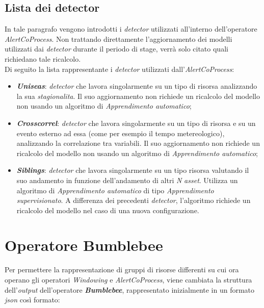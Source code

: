 \subsection{Lista dei detector}\label{sec:detector-alertcoprocess}
In tale paragrafo vengono introdotti i \textit{detector} utilizzati all'interno dell'operatore \textit{AlertCoProcess}. Non trattando direttamente l'aggiornamento dei modelli utilizzati dai \textit{detector} durante il periodo di stage, verrà solo citato quali richiedano tale ricalcolo.\\
Di seguito la lista rappresentante i \textit{detector} utilizzati dall'\textit{AlertCoProcess}:
\begin{itemize}
	\item{\textbf{\textit{Uniseas}}: \textit{detector} che lavora singolarmente su un tipo di risorsa analizzando la sua \textit{\gls{stagionalita}}. Il suo aggiornamento non richiede un ricalcolo del modello non usando un algoritmo di \textit{\gls{Apprendimento automatico}};}
	\item{\textbf{\textit{Crosscorrel}}: \textit{detector} che lavora singolarmente su un tipo di risorsa e su un evento esterno ad essa (come per esempio il tempo metereologico), analizzando la correlazione tra variabili. Il suo aggiornamento non richiede un ricalcolo del modello non usando un algoritmo di \textit{\gls{Apprendimento automatico}};}
	\item{\textbf{\textit{Siblings}}: \textit{detector} che lavora singolarmente su un tipo risorsa valutando il suo andamento in funzione dell'andamento di altri \textit{N} \textit{asset}. Utilizza un algoritmo di \textit{\gls{Apprendimento automatico}} di tipo \textit{\gls{Apprendimento supervisionato}}. A differenza dei precedenti \textit{detector}, l'algoritmo richiede un ricalcolo del modello nel caso di una nuova configurazione.}
\end{itemize}


\section{Operatore Bumblebee}\label{sec:bbout}
Per permettere la rappresentazione di gruppi di risorse differenti su cui ora operano gli operatori \textit{Windowing} e \textit{AlertCoProcess}, viene cambiata la struttura dell'\textit{output} dell'operatore \textbf{\textit{Bumblebee}}, rappresentato inizialmente in un formato \textit{\gls{json}} così formato:

